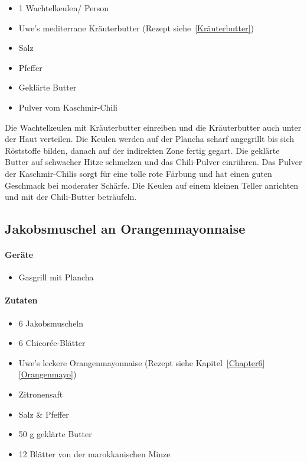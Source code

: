 \begin{itemize}[noitemsep]
	\item 1 Wachtelkeulen/ Person
	\item Uwe's mediterrane Kräuterbutter (Rezept siehe~\vref{Kräuterbutter})
	\item Salz
	\item Pfeffer
	\item Geklärte Butter
	\item Pulver vom Kaschmir-Chili
\end{itemize}

Die Wachtelkeulen mit Kräuterbutter einreiben und die Kräuterbutter auch unter der Haut verteilen. Die Keulen werden auf der Plancha scharf angegrillt bis sich Röststoffe bilden, danach auf der indirekten Zone fertig gegart. Die geklärte Butter auf schwacher Hitze schmelzen und das Chili-Pulver einrühren. Das Pulver der Kaschmir-Chilis sorgt für eine tolle rote Färbung und hat einen guten  Geschmack bei moderater Schärfe. Die Keulen auf einem kleinen Teller anrichten und mit der Chili-Butter beträufeln.

\subsection{Jakobsmuschel an Orangenmayonnaise}

\paragraph{Geräte}

\begin{itemize}
	\item Gasgrill mit Plancha
\end{itemize}

\paragraph{Zutaten}

\begin{itemize}[noitemsep]
	\item 6 Jakobsmuscheln
	\item 6 Chicorée-Blätter
	\item Uwe's leckere Orangenmayonnaise (Rezept siehe 
	Kapitel~\ref{Chapter6} \vref{Orangenmayo})
	\item Zitronensaft
	\item Salz \& Pfeffer
	\item 50 g geklärte Butter
	\item 12 Blätter von der marokkanischen Minze
\end{itemize}

